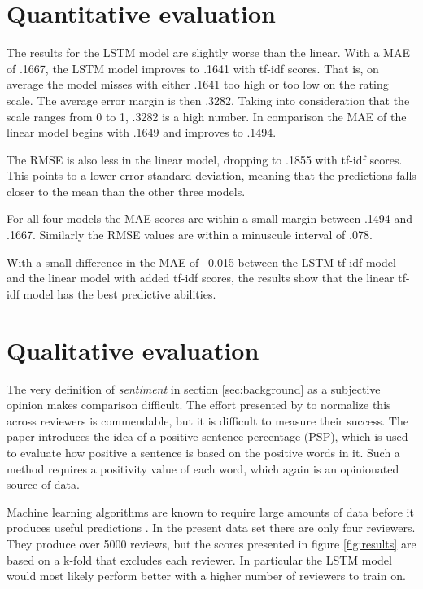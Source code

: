 \documentclass[a4paper]{article}
\begin{document}
\section{Quantitative evaluation}
The results for the LSTM model are slightly worse than the linear. With a MAE
of .1667, the LSTM model improves to .1641 with tf-idf scores. That is,
on average the model misses with either .1641 too high or too low on the
rating scale. The average error margin is then .3282. Taking into consideration
that the scale ranges from 0 to 1, .3282 is a high number.
In comparison the MAE of the linear model begins with .1649 and improves to
.1494.

The RMSE is also less in the linear model, dropping to .1855 with tf-idf scores.
This points to a lower error standard deviation, meaning that the predictions
falls closer to the mean than the other three models.

For all four models the MAE scores are within a small margin between .1494 and
.1667. Similarly the RMSE values are within a minuscule interval of .078.

With a small difference in the MAE of ~0.015 between the LSTM tf-idf model and
the linear model with added tf-idf scores, the results show that the linear
tf-idf model has the best predictive abilities.

\section{Qualitative evaluation}
The very definition of \textit{sentiment} in section \ref{sec:background} as
a subjective opinion makes comparison difficult. The effort presented by
\cite{PangLee2005} to normalize this across reviewers is commendable, but it
is difficult to measure their success. The paper introduces the idea of a positive
sentence percentage (PSP), which is used to evaluate how positive a sentence
is based on the positive words in it. Such a method requires a positivity value
of each word, which again is an opinionated source of data.

Machine learning algorithms are known to require large amounts of data before
it produces useful predictions \citep{Schmidhuber2015, Russell2009}. In the
present data set there are only four reviewers. They produce over 5000 reviews,
but the scores presented in figure \ref{fig:results} are based on a k-fold that
excludes each reviewer. In particular the LSTM model would most likely perform
better with a higher number of reviewers to train on.
\end{document}
